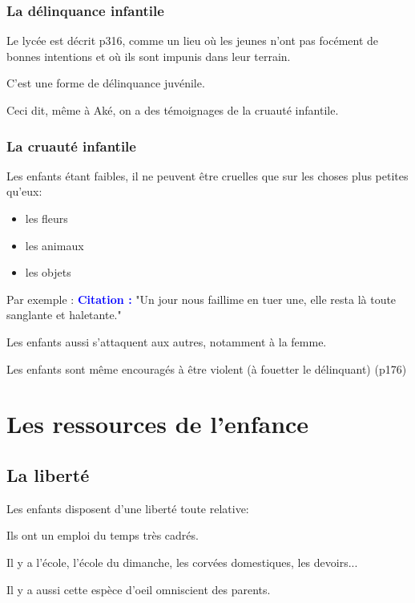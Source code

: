 \documentclass[a4paper, 11pt, hidelinks]{article}
\newcommand{\bs}{\bigskip}
\newcommand{\cit}{\large \textcolor{blue}{\textbf{Citation :}} \large }
\begin{document}
\subsubsection{La délinquance infantile}
Le lycée est décrit p316, comme un lieu où les jeunes n'ont pas focément de bonnes intentions et où ils sont impunis dans leur
terrain.

C'est une forme de délinquance juvénile.

\bs

Ceci dit, même à Aké, on a des témoignages de la cruauté infantile.



\subsubsection{La cruauté infantile}

Les enfants étant faibles, il ne peuvent être cruelles que sur les choses plus petites qu'eux: 

\begin{itemize}
    \item les fleurs
    \item les animaux
    \item les objets
\end{itemize}

Par exemple : \cit "Un jour nous faillime en tuer une, elle resta là toute sanglante et haletante."
\bs


Les enfants aussi s'attaquent aux autres, notamment à la femme. 

\bs

Les enfants sont même encouragés à être violent (à fouetter le délinquant) (p176)



\section{Les ressources de l'enfance}


\subsection{La liberté}

Les enfants disposent d'une liberté toute relative: 
\bs


Ils ont un emploi du temps très cadrés.

Il y a l'école, l'école du dimanche, les corvées domestiques, les devoirs...
\bs


Il y a aussi cette espèce d'oeil omniscient des parents.
\bs
\end{document}
